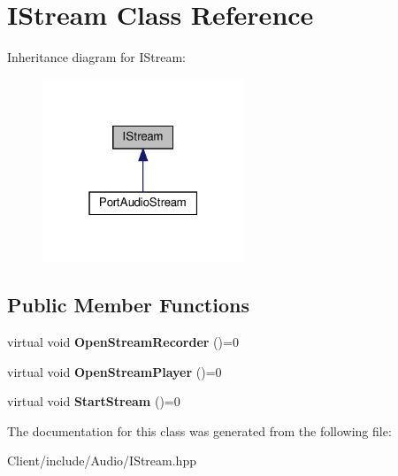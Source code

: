 \hypertarget{class_i_stream}{}\section{I\+Stream Class Reference}
\label{class_i_stream}


Inheritance diagram for I\+Stream\+:
\nopagebreak
\begin{figure}[H]
\begin{center}
\leavevmode
\includegraphics[width=171pt]{class_i_stream__inherit__graph}
\end{center}
\end{figure}
\subsection*{Public Member Functions}
\begin{DoxyCompactItemize}
\item 
\mbox{\label{class_i_stream_a844cd2b5207b323ba158d765d4441199}} 
virtual void {\bfseries Open\+Stream\+Recorder} ()=0
\item 
\mbox{\label{class_i_stream_a71920441111ee52b6269e77adb455f51}} 
virtual void {\bfseries Open\+Stream\+Player} ()=0
\item 
\mbox{\label{class_i_stream_a3b8cf2e054144598b50041174a3be595}} 
virtual void {\bfseries Start\+Stream} ()=0
\end{DoxyCompactItemize}


The documentation for this class was generated from the following file\+:\begin{DoxyCompactItemize}
\item 
Client/include/\+Audio/I\+Stream.\+hpp\end{DoxyCompactItemize}
